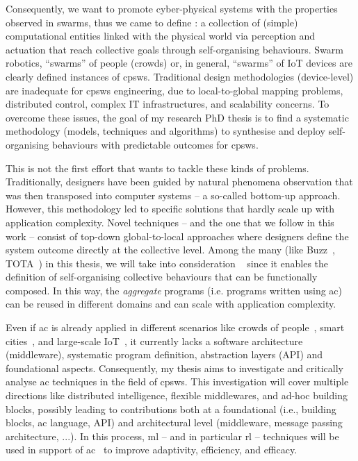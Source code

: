 \documentclass[11pt]{article}
\begin{document}
Consequently, we want to promote cyber-physical systems with the properties observed in swarms, thus we came to define : a collection of (simple) computational entities linked with the physical world via perception and actuation that reach collective goals through self-organising behaviours.
%
Swarm robotics, ``swarms” of people (crowds) or, in general, ``swarms” of IoT devices are clearly defined instances of \acp{cpsw}.
%
Traditional design methodologies (device-level) are inadequate for \acp{cpsw} engineering, due to local-to-global mapping problems, distributed control, complex IT infrastructures, and scalability concerns.
%
To overcome these issues, the goal of my research PhD thesis is to find a systematic methodology (models, techniques and algorithms) to synthesise and deploy self-organising behaviours with predictable outcomes for \acp{cpsw}.

This is not the first effort that wants to tackle these kinds of problems. 
%
Traditionally, designers have been guided by natural phenomena observation that was then transposed into computer systems -- a so-called bottom-up approach. 
%
However, this methodology led to specific solutions that hardly scale up with application complexity.
%
Novel techniques -- and the one that we follow in this work -- consist of top-down global-to-local approaches where designers define the system outcome directly at the collective level.
%
Among the many (like Buzz~\cite{DBLP:journals/software/PinciroliB16}, TOTA~\cite{DBLP:conf/icdcsw/MameiZL03}) in this thesis, we will take into consideration ~\cite{DBLP:journals/computer/BealPV15} since it enables the definition of self-organising collective behaviours that can be functionally composed. 
%
In this way, the \textit{aggregate} programs (i.e. programs written using \ac{ac}) can be reused in different domains and can scale with application complexity. 

Even if \ac{ac} is already applied in different scenarios like crowds of people~\cite{DBLP:journals/computer/BealPV15}, smart cities~\cite{DBLP:journals/isci/CasadeiFPRSV19}, and large-scale IoT~\cite{DBLP:journals/fgcs/CasadeiFPRSV19}, it currently lacks a software architecture (middleware), systematic program definition, abstraction layers (API) and foundational aspects.
%
Consequently, my thesis aims to investigate and critically analyse \ac{ac} techniques in the field of \acp{cpsw}.
%
This investigation will cover multiple directions like distributed intelligence, flexible middlewares, and ad-hoc building blocks, possibly leading to contributions both at a foundational (i.e., building blocks, \ac{ac} language, API) and architectural level (middleware, message passing architecture, ...).
%
In this process, \ac{ml} -- and in particular \ac{rl} -- techniques will be used in support of \ac{ac}~\cite{research} to improve adaptivity, efficiency, and efficacy.
\end{document}
